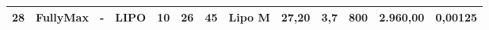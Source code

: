 \begin{table}[htp]
\begin{tabular}{|c|c|c|c|c|c|c|c|c|c|c|c|c|}
28                                               & FullyMax                                    & -                                            & LIPO                                                 & 10         & 26        & 45        & Lipo M                                                  & 27,20                                       & 3,7                                                      & 800                                       & 2.960,00                                 & 0,00125                                        \\[2pt] \hline
\end{tabular}
\end{table}

